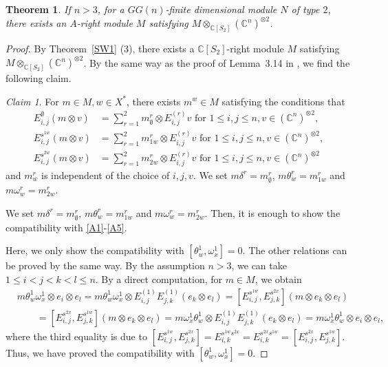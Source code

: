 \documentclass{article}
\newtheorem{Theorem}[equation]{Theorem}
\theoremstyle{definition}
\theoremstyle{remark}
\numberwithin{equation}{section}
\newtheorem{Claim}[equation]{Claim}
\numberwithin{equation}{section}
\begin{document}
\begin{Theorem}
If $n>3$, for a $GG(n)$-finite dimensional module $N$ of type $2$, there exists an $A$-right module $M$ satisfying $M\otimes_{\mathbb{C}[S_2]}(\mathbb{C}^n)^{\otimes2}$.
\end{Theorem}
\begin{proof}
By Theorem~\ref{SW1} (3), there exists a $\mathbb{C}[S_2]$-right module $M$ satisfying $M\otimes_{\mathbb{C}[S_2]}(\mathbb{C}^n)^{\otimes2}$. By the same way as the proof of Lemma~3.14 in \cite{GJU}, we find the following claim. 
\begin{Claim}
For $m\in M,w\in X^*$, there exists $m^{w}\in M$ satisfying the conditions that
\begin{align*}
E^\emptyset_{i,j}(m\otimes v)&=\sum_{r=1}^2m^r_{\emptyset}\otimes E^{(r)}_{i,j}v\text{ for }1\leq i,j\leq n,v\in(\mathbb{C}^n)^{\otimes2},\\
E^{s^{1w}}_{i,j}(m\otimes v)&=\sum_{r=1}^2m^r_{1w}\otimes E^{(r)}_{i,j}v\text{ for }1\leq i,j\leq n,v\in(\mathbb{C}^n)^{\otimes2},\\
E^{s^{2w}}_{i,j}(m\otimes v)&=\sum_{r=1}^2m^r_{2w}\otimes E^{(r)}_{i,j}v\text{ for }1\leq i,j\leq n,v\in(\mathbb{C}^n)^{\otimes2}
\end{align*}
and $m^r_w$ is independent of the choice of $i,j,v$. We set $m\delta^r=m^r_\emptyset$, $m\theta^r_w=m^r_{1w}$ and $m\omega^r_w=m^r_{2w}$. 
\end{Claim}
We set $m\delta^r=m^r_\emptyset$, $m\theta^r_w=m^r_{1w}$ and $m\omega^r_w=m^r_{2w}$. Then, it is enough to show the compatibility with \eqref{A1}-\eqref{A5}.

Here, we only show the compatibility with $[\theta^1_w,\omega^1_x]=0$. The other relations can be proved by the same way. By the assumption $n>3$, we can take $1\leq i<j<k<l\leq n$. By a direct computation, for $m\in M$, we obtain
\begin{align*}
&m\theta^1_w\omega^1_x\otimes e_i\otimes e_l=m\theta^1_w\omega^1_x\otimes E^{(1)}_{i,j}E^{(1)}_{j,k}(e_k\otimes e_l)=[E^{s^{1w}}_{i,j},E^{s^{2x}}_{j,k}](m\otimes e_k\otimes e_l)\\
&\qquad=[E^{s^{2x}}_{i,j},E^{s^{1w}}_{j,k}](m\otimes e_k\otimes e_l)=m\omega^1_x\theta^1_w\otimes E^{(1)}_{i,j}E^{(1)}_{j,k}(e_k\otimes e_l)=m\omega^1_x\theta^1_w\otimes e_i\otimes e_l,
\end{align*}
where the third equality is due to $[E^{s^{1w}}_{i,j},E^{s^{2x}}_{j,k}]=E^{s^{1w}s^{2x}}_{i,k}=E^{s^{2x}s^{1w}}_{i,k}=[E^{s^{2x}}_{i,j},E^{s^{1w}}_{j,k}]$. Thus, we have proved the compatibility with $[\theta^1_w,\omega^1_x]=0$.
\end{proof}
\end{document}
